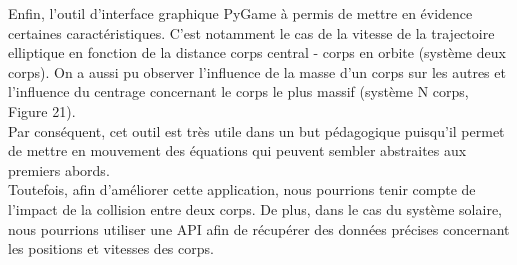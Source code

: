 \documentclass[a4paper, 12pt]{article}
\begin{document}
Enfin, l’outil d’interface graphique PyGame à permis de mettre en évidence certaines caractéristiques.
C’est notamment le cas de la vitesse de la trajectoire elliptique en fonction de la distance corps central - corps en orbite (système deux corps).
On a aussi pu observer l’influence de la masse d’un corps sur les autres et l'influence du centrage concernant le corps le plus massif (système N corps, Figure 21).\\

Par conséquent, cet outil est très utile dans un but pédagogique puisqu'il permet de mettre en mouvement des équations qui peuvent sembler abstraites aux premiers abords. \\

Toutefois, afin d'améliorer cette application, nous pourrions tenir compte de l'impact de la collision entre deux corps. De plus, dans le cas du système solaire, nous pourrions utiliser une API afin de récupérer des données précises concernant les positions et vitesses des corps.
\end{document}
